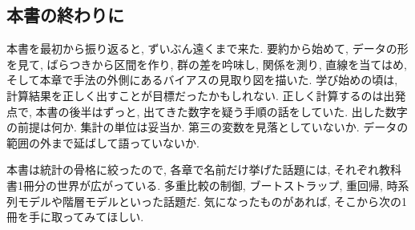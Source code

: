 \subsection{本書の終わりに}

本書を最初から振り返ると, ずいぶん遠くまで来た.
要約から始めて, データの形を見て, ばらつきから区間を作り, 群の差を吟味し, 関係を測り, 直線を当てはめ, そして本章で手法の外側にあるバイアスの見取り図を描いた.
学び始めの頃は, 計算結果を正しく出すことが目標だったかもしれない.
正しく計算するのは出発点で, 本書の後半はずっと, 出てきた数字を疑う手順の話をしていた.
出した数字の前提は何か. 集計の単位は妥当か. 第三の変数を見落としていないか. データの範囲の外まで延ばして語っていないか.

本書は統計の骨格に絞ったので, 各章で名前だけ挙げた話題には, それぞれ教科書1冊分の世界が広がっている.
多重比較の制御, ブートストラップ, 重回帰, 時系列モデルや階層モデルといった話題だ.
気になったものがあれば, そこから次の1冊を手に取ってみてほしい.
